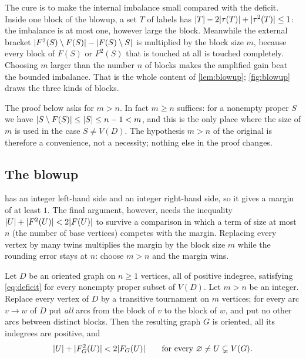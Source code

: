 \begin{ideabox}
The cure is to make the internal imbalance small compared with the deficit. Inside one block of the
blowup, a set $T$ of labels has $\lvert T\rvert-2\lvert \tau(T)\rvert+\lvert \tau^2(T)\rvert\le1$: the imbalance is at most
one, however large the block. Meanwhile the external bracket
$\lvert F^2(S)\setminus F(S)\rvert-\lvert F(S)\setminus S\rvert$ is multiplied by the block size $m$, because every
block of $F(S)$ or $F^2(S)$ that is touched at all is touched completely. Choosing $m$ larger than the
number $n$ of blocks makes the amplified gain beat the bounded imbalance. That is the whole content
of \cref{lem:blowup}; \cref{fig:blowup} draws the three kinds of blocks.
\end{ideabox}

\begin{remark}\label{rem:m}
The proof below asks for $m>n$. In fact $m\ge n$ suffices: for a nonempty proper $S$ we have
$\lvert S\setminus F(S)\rvert\le\lvert S\rvert\le n-1<m$, and this is the only place where the size of $m$ is used
in the case $S\ne V(D)$. The hypothesis $m>n$ of the original is therefore a convenience, not a
necessity; nothing else in the proof changes.
\end{remark}

\subsection{The blowup}\label{sec:blowup}

\begin{ideabox}
 has an integer left-hand side and an integer right-hand side, so it gives a
margin of at least $1$. The final argument, however, needs the inequality $\lvert U\rvert+\lvert F^2(U)\rvert<
2\lvert F(U)\rvert$ to survive a comparison in which a term of size at most $n$ (the number of base
vertices) competes with the margin. Replacing every vertex by many twins multiplies the margin by
the block size $m$ while the rounding error stays at $n$: choose $m>n$ and the margin wins.
\end{ideabox}

\begin{lemma}\label{lem:blowup}
Let $D$ be an oriented graph on $n\ge1$ vertices, all of positive indegree, satisfying
\eqref{eq:deficit} for every nonempty proper subset of $V(D)$. Let $m>n$ be an integer. Replace
every vertex of $D$ by a transitive tournament on $m$ vertices; for every arc $v\to w$ of $D$ put
\emph{all} arcs from the block of $v$ to the block of $w$, and put no other arcs between distinct
blocks. Then the resulting graph $G$ is oriented, all its indegrees are positive, and
\[
 \lvert U\rvert+\lvert F_G^2(U)\rvert<2\lvert F_G(U)\rvert
 \qquad\text{for every }\varnothing\ne U\subsetneq V(G).
\]
\end{lemma}

